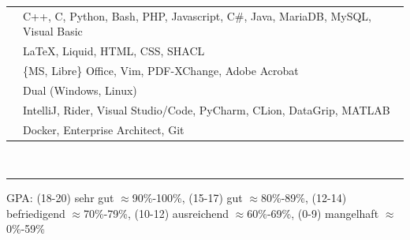 \documentclass[onside]{article}
\newcommand{\externallink}[2]{
    \href{#1}{\scalebox{#2}{\faExternalLink}}
}
\renewcommand{\externallink}[3]{%
    \ifthenelse{\equal{#3}{true}}{%
        \href{#1}{$^{\scalebox{#2}{\faExternalLink}}$}%
    }{%
        \href{#1}{\scalebox{#2}{\faExternalLink}}%
    }%
}
\renewcommand{\externallink}[5]{%
    \href{#1}{\raisebox{{#3}ex}{\hspace{{#4}em}\rotatebox{#5}{\scalebox{#2}{\faExternalLink}}}}%
}
\begin{document}
{\begin{minipage}[t][\textheight-2\fboxsep-2\fboxrule][t]{\dimexpr0.40\textwidth-2\fboxrule-2\fboxsep\relax}
        \begin{tabularx}{\textwidth}{cY}
            \faCode{}        & {\textcolor{green!75!black}{C++}}, {\textcolor{green!75!black}{C}}, {\textcolor{red!45!white}{Python}}, {\textcolor{magenta!40!white}{Bash}}, {\textcolor{green!75!black}{PHP}}, {\textcolor{green!75!black}{Javascript}}, {\textcolor{red!45!white}{C\#}}, {\textcolor{red!45!white}{Java}}, {\textcolor{green!75!black}{MariaDB}}, {\textcolor{green!75!black}{MySQL}}, {\textcolor{magenta!40!white}{Visual Basic}} \\
            \faPen*{}        & {\textcolor{red!45!white}{\LaTeX}}, {\textcolor{red!45!white}{Liquid}}, {\textcolor{red!45!white}{HTML}}, {\textcolor{green!75!black}{CSS}}, {\textcolor{magenta!40!white}{SHACL}} \\
            \faFont{}        & \{MS, Libre\} Office, Vim, PDF-XChange,  Adobe Acrobat \\
            \faCogs{}        & Dual (Windows, Linux) \\
            \faLaptopCode{}  & IntelliJ, Rider, Visual Studio/Code, PyCharm,  CLion, DataGrip, MATLAB\\
            \faToolbox{}     & Docker, Enterprise Architect, Git
        \end{tabularx}
        \vspace{1pt} \\
        \rule{\linewidth}{0.4pt}

        \vfill
        \begin{center}
            {\tiny GPA: (18-20) sehr gut $\approx$90\%-100\%, (15-17) gut $\approx$80\%-89\%, (12-14) befriedigend $\approx$70\%-79\%, (10-12) ausreichend $\approx$60\%-69\%, (0-9) mangelhaft $\approx$0\%-59\%}
            \externallink{https://en.wikipedia.org/wiki/Academic_grading_in_Iran}{0.52}{0.95}{-0.5}{0}
        \end{center}
    \end{minipage}
}
\hfill
\end{document}
